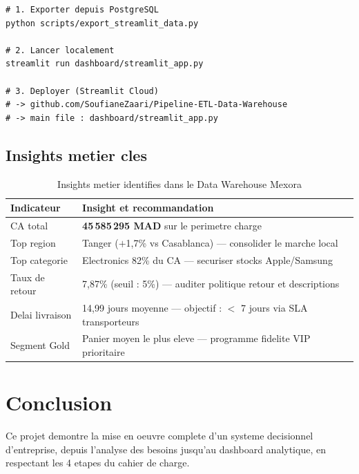 \documentclass[12pt,a4paper]{article}
\begin{document}
\begin{lstlisting}[style=bash, caption=Workflow export et lancement Streamlit]
# 1. Exporter depuis PostgreSQL
python scripts/export_streamlit_data.py

# 2. Lancer localement
streamlit run dashboard/streamlit_app.py

# 3. Deployer (Streamlit Cloud)
# -> github.com/SoufianeZaari/Pipeline-ETL-Data-Warehouse
# -> main file : dashboard/streamlit_app.py
\end{lstlisting}

\subsection{Insights metier cles}

\begin{table}[H]
\centering
\begin{tabular}{p{3.5cm} p{10cm}}
\toprule
\textbf{Indicateur} & \textbf{Insight et recommandation}\\
\midrule
CA total & \textbf{45\,585\,295 MAD} sur le perimetre charge\\
Top region & Tanger ($+$1,7\% vs Casablanca) --- consolider le marche local\\
Top categorie & Electronics 82\% du CA --- securiser stocks Apple/Samsung\\
Taux de retour & 7,87\% (seuil : 5\%) --- auditer politique retour et descriptions\\
Delai livraison & 14,99 jours moyenne --- objectif : $<$ 7 jours via SLA transporteurs\\
Segment Gold & Panier moyen le plus eleve --- programme fidelite VIP prioritaire\\
\bottomrule
\end{tabular}
\caption{Insights metier identifies dans le Data Warehouse Mexora}
\end{table}

\newpage

\section{Conclusion}

Ce projet demontre la mise en oeuvre complete d'un systeme decisionnel d'entreprise, depuis
l'analyse des besoins jusqu'au dashboard analytique, en respectant les 4 etapes du cahier de
charge.
\end{document}
